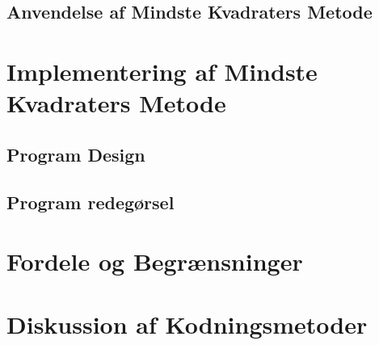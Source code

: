 
\subsection{Anvendelse af Mindste Kvadraters Metode}


\section{Implementering af Mindste Kvadraters Metode}


\subsection{Program Design}

\subsection{Program redegørsel}

\section{Fordele og Begrænsninger}

\section{Diskussion af Kodningsmetoder}
